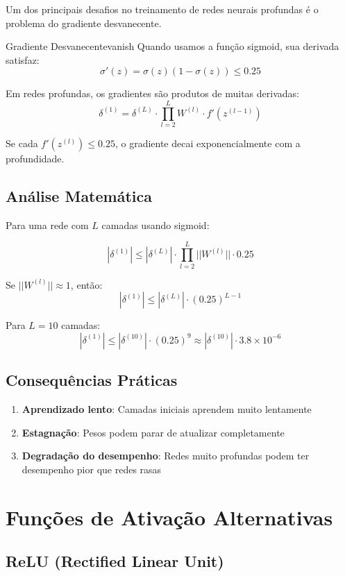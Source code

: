 \documentclass[a4paper,12pt]{article}
\begin{document}
Um dos principais desafios no treinamento de redes neurais profundas é o problema do gradiente desvanecente.

\begin{observacao}{Gradiente Desvanecente}{vanish}
Quando usamos a função sigmoid, sua derivada satisfaz:
$$\sigma'(z) = \sigma(z)(1 - \sigma(z)) \leq 0.25$$

Em redes profundas, os gradientes são produtos de muitas derivadas:
$$\delta^{(1)} = \delta^{(L)} \cdot \prod_{l=2}^{L} W^{(l)} \cdot f'(z^{(l-1)})$$

Se cada $f'(z^{(l)}) \leq 0.25$, o gradiente decai exponencialmente com a profundidade.
\end{observacao}

\subsection{Análise Matemática}

Para uma rede com $L$ camadas usando sigmoid:

$$|\delta^{(1)}| \leq |\delta^{(L)}| \cdot \prod_{l=2}^{L} ||W^{(l)}|| \cdot 0.25$$

Se $||W^{(l)}|| \approx 1$, então:
$$|\delta^{(1)}| \leq |\delta^{(L)}| \cdot (0.25)^{L-1}$$

Para $L = 10$ camadas:
$$|\delta^{(1)}| \leq |\delta^{(10)}| \cdot (0.25)^9 \approx |\delta^{(10)}| \cdot 3.8 \times 10^{-6}$$

\subsection{Consequências Práticas}

\begin{enumerate}
    \item \textbf{Aprendizado lento}: Camadas iniciais aprendem muito lentamente
    \item \textbf{Estagnação}: Pesos podem parar de atualizar completamente
    \item \textbf{Degradação do desempenho}: Redes muito profundas podem ter desempenho pior que redes rasas
\end{enumerate}

\section{Funções de Ativação Alternativas}

\subsection{ReLU (Rectified Linear Unit)}
\end{document}
